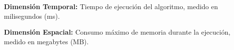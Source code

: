 
\begin{listaVar}
    \item \textbf{Dimensión Temporal:} Tiempo de ejecución del algoritmo, medido en milisegundos (ms).
    \item \textbf{Dimensión Espacial:} Consumo máximo de memoria durante la ejecución, medido en megabytes (MB).
\end{listaVar}